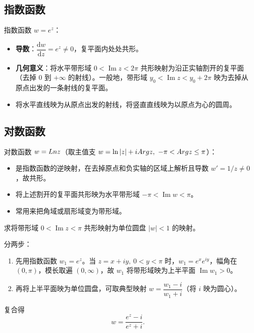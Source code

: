 \subsection{指数函数}
\begin{tcolorbox}[colframe=teal!60!black, colback=teal!5!white, sharp corners]
  指数函数 \(w=e^z\)：
  \begin{itemize}
    \item \textbf{导数}：\(\dfrac{\mathrm{d}w}{\mathrm{d}z}=e^z\neq0\)，复平面内处处共形。
    \item \textbf{几何意义}：将水平带形域 \(0<\operatorname{Im} z < 2\pi\) 共形映射为沿正实轴割开的复平面（去掉 \(0\) 到 \(+\infty\) 的射线）。一般地，带形域 \(y_0 < \operatorname{Im}z < y_0 + 2\pi\) 映为去掉从原点出发的一条射线的复平面。
    \item 将水平直线映为从原点出发的射线，将竖直直线映为以原点为心的圆周。
  \end{itemize}
\end{tcolorbox}

\subsection{对数函数}
\begin{tcolorbox}[colframe=teal!60!black, colback=teal!5!white, sharp corners]
  对数函数 \(w = Ln z\)（取主值支 \(w = \ln|z| + iArg z,\ -\pi < Arg z \le \pi\)）：
  \begin{itemize}
    \item 是指数函数的逆映射，在去掉原点和负实轴的区域上解析且导数 \(w' = 1/z \neq 0\)，故共形。
    \item 将上述割开的复平面共形映为水平带形域 \(-\pi < \operatorname{Im}w < \pi\)。
    \item 常用来把角域或扇形域变为带形域。
  \end{itemize}
\end{tcolorbox}

\begin{example}[指数函数与带形域]
  求将带形域 \(0 < \operatorname{Im} z < \pi\) 共形映射为单位圆盘 \(|w|<1\) 的映射。
\end{example}
\begin{solution}
  分两步：
  \begin{enumerate}
    \item 先用指数函数 \(w_1 = e^z\)。当 \(z = x+iy,\ 0<y<\pi\) 时，\(w_1 = e^x e^{iy}\)，幅角在 \((0,\pi)\)，模长取遍 \((0,\infty)\)，故 \(w_1\) 将带形域映为上半平面 \(\operatorname{Im} w_1 > 0\)。
    \item 再将上半平面映为单位圆盘，可取典型映射 \(w = \dfrac{w_1 - i}{w_1 + i}\)（将 \(i\) 映为圆心）。
  \end{enumerate}
  复合得
  \[
  w = \frac{e^z - i}{e^z + i}.
  \]
\end{solution}

